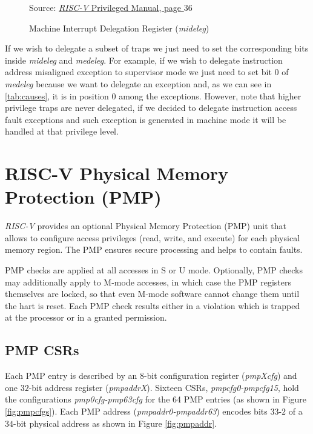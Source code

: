 \begin{figure}[htbp]
  \centering
  \def\stackalignment{r} %
  {\scriptsize Source: \href{https://drive.google.com/file/d/17GeetSnT5wW3xNuAHI95-SI1gPGd5sJ_/view}{\textit{RISC-V} Privileged Manual, page $36$}}
  \caption{Machine Interrupt Delegation Register (\textit{mideleg})}
  \label{fig:mideleg}
\end{figure}

If we wish to delegate a subset of traps we just need to set the corresponding bits
inside \textit{mideleg} and \textit{medeleg}. For example, if we wish to delegate
instruction address misaligned exception to supervisor mode we just need to set bit
$0$ of \textit{medeleg} because we want to delegate an exception and, as we can see
in \ref{tab:causes}, it is in position $0$ among the exceptions. However, note
that higher privilege traps are never delegated, if we decided to delegate instruction
access fault exceptions and such exception is generated in machine mode it will be
handled at that privilege level.

\section{RISC-V Physical Memory Protection (PMP)}
\label{sec:riscv_pmp}

\textit{RISC-V} provides an optional Physical Memory Protection (PMP) unit that allows
to configure access privileges (read, write, and execute) for each physical memory
region. The PMP ensures secure processing and helps to contain faults.

PMP checks are applied at all accesses in S or U mode. Optionally, PMP checks
may additionally apply to M-mode accesses, in which case the PMP registers themselves
are locked, so that even M-mode software cannot change them until the hart is
reset. Each PMP check results either in a violation which is trapped at the processor
or in a granted permission.

\subsection{PMP CSRs}
\label{subsec:riscv_pmpcsr}

Each PMP entry is described by an 8-bit configuration register (\textit{pmpXcfg})
and one $32$-bit address register (\textit{pmpaddrX}). Sixteen CSRs, \textit{pmpcfg0-pmpcfg15},
hold the configurations \textit{pmp0cfg-pmp63cfg} for the 64 PMP entries (as
shown in Figure \ref{fig:pmpcfgs}). Each PMP address (\textit{pmpaddr0-pmpaddr63})
encodes bits $33$-$2$ of a $34$-bit physical address as shown in Figure \ref{fig:pmpaddr}.

